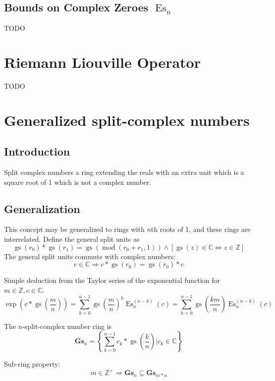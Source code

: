 \documentclass[]{article}
\DeclareMathOperator{\es}{Es}
\DeclareMathOperator{\gs}{gs}
\DeclareMathOperator{\md}{mod}
\newcommand{\pqty}[1]{{\left(#1\right)}}
\newcommand{\Bqty}[1]{{\left\{#1\right\}}}
\newcommand{\bqty}[1]{{\left[#1\right]}}
\begin{document}
	
	\subsection{Bounds on Complex Zeroes \(\es_n\)}
	TODO
	
	\section{Riemann Liouville Operator}
	TODO
	
	\section{Generalized split-complex numbers}
	\subsection{Introduction}
	Split complex numbers a ring extending the reals with an extra unit which is a square root of 1 which is not a complex number.
	\subsection{Generalization}
	This concept may be generalized to rings with $n$th roots of 1, and these rings are interrelated. Define the general split units as
	\begin{equation}
	\gs\pqty{r_0}*\gs\pqty{r_1}=\gs\pqty{\md\pqty{r_0+r_1,1}}
	\land
	\bqty{\gs\pqty{z}\in\mathbb{C}\Leftrightarrow z\in\mathbb{Z}}
	\end{equation}
	The general split units commute with complex numbers:
	\begin{equation}
	c\in\mathbb{C}\Rightarrow c*\gs\pqty{r_0}=\gs\pqty{r_0}*c
	\end{equation}
	
	Simple deduction from the Taylor series of the exponential function for $m\in\mathbb{Z}, c\in\mathbb{C}$.
	\begin{equation}
	\exp\pqty{c*\gs\pqty{\frac{m}{n}}}=\sum_{k=0}^{n-1}\gs\pqty{\frac{m}{n}}^k \es_n^{(n-k)}\pqty{c}
	=\sum_{k=0}^{n-1}\gs\pqty{\frac{km}{n}} \es_n^{(n-k)}\pqty{c}
	\end{equation}
	
	The $n$-split-complex number ring is
	\begin{equation}
	\mathbf{Gs}_n=\Bqty{\sum_{k=0}^{n-1} c_k*\gs\pqty{\frac{k}{n}} \Bigg\vert c_k\in\mathbb{C}}
	\end{equation}
	
	Sub-ring property:
	\begin{equation}
	m\in\mathbb{Z}^+\Rightarrow\mathbf{Gs}_n\subseteq\mathbf{Gs}_{m*n}
	\end{equation}
	
\end{document}
